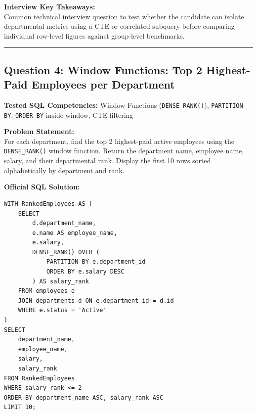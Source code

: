 \documentclass[11pt,a4paper]{article}
\begin{document}
\vspace{0.15cm}
\noindent\textbf{Interview Key Takeaways:} \\
Common technical interview question to test whether the candidate can isolate departmental metrics using a CTE or correlated subquery before comparing individual row-level figures against group-level benchmarks.

\vspace{0.4cm}
\noindent\rule{\textwidth}{0.4pt}
\vspace{0.4cm}

\subsection*{Question 4: Window Functions: Top 2 Highest-Paid Employees per Department}

\noindent\textbf{Tested SQL Competencies:} Window Functions (\texttt{DENSE\_RANK()}), \texttt{PARTITION BY}, \texttt{ORDER BY} inside window, CTE filtering

\vspace{0.15cm}
\noindent\textbf{Problem Statement:} \\
For each department, find the top 2 highest-paid active employees using the \texttt{DENSE\_RANK()} window function. Return the department name, employee name, salary, and their departmental rank. Display the first 10 rows sorted alphabetically by department and rank.

\vspace{0.25cm}
\noindent\textbf{Official SQL Solution:}
\begin{verbatim}
WITH RankedEmployees AS (
    SELECT 
        d.department_name,
        e.name AS employee_name,
        e.salary,
        DENSE_RANK() OVER (
            PARTITION BY e.department_id 
            ORDER BY e.salary DESC
        ) AS salary_rank
    FROM employees e
    JOIN departments d ON e.department_id = d.id
    WHERE e.status = 'Active'
)
SELECT 
    department_name,
    employee_name,
    salary,
    salary_rank
FROM RankedEmployees
WHERE salary_rank <= 2
ORDER BY department_name ASC, salary_rank ASC
LIMIT 10;
\end{verbatim}
\end{document}
